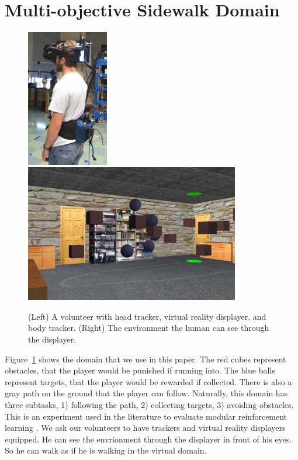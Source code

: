 \documentclass[11pt]{article} %
\begin{document}
\section{Multi-objective Sidewalk Domain}
\label{sec:domain}

\begin{figure}[h!]
\centering
\includegraphics[height=6cm]{human.jpg}
\includegraphics[height=6cm]{env.png}
\caption{(Left) A volunteer with head tracker, virtual reality displayer, and
body tracker.  (Right) The environment the human can see through the displayer.}
\label{fig:avatar}
\end{figure}

Figure~\ref{fig:avatar} shows the domain that we use in this paper. The red
cubes represent obstacles, that the player would be punished if running
into. The blue balls represent targets, that the player would be rewarded if
collected. There is also a gray path on the ground that the player can follow.
Naturally, this domain has three subtasks, 1) following the path, 2)
collecting targets, 3) avoiding obstacles.
This is an experiment used in the
literature to evaluate modular reinforcement learning
\cite{rothkopf2013modular}.
We ask our volunteers to have trackers and virtual reality displayers equipped. He
can see the envrionment through the displayer in front of his eyes. So he can
walk as if he is walking in the virtual domain.
\end{document}
